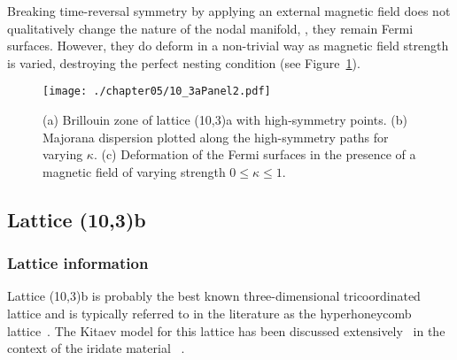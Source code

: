 Breaking time-reversal symmetry by applying an external magnetic field does not qualitatively change the nature of the nodal manifold, \ie, they remain Fermi surfaces.
However, they do deform in a non-trivial way as magnetic field strength is varied, destroying the perfect nesting condition (see Figure~\ref{fig:chapter05_10_3aPanel2}).
%
\begin{figure}[tb]
	\centering
	\texttt{[image: ./chapter05/10\_3aPanel2.pdf]}
	\caption{
		(a) Brillouin zone of lattice (10,3)a with high-symmetry points.
		(b) Majorana dispersion plotted along the high-symmetry paths for varying $\kappa$.
		(c) Deformation of the Fermi surfaces in the presence of a magnetic field of varying strength $0 \leq \kappa \leq 1$.
	}
	\label{fig:chapter05_10_3aPanel2}
\end{figure}
%


%
%
\subsection{Lattice (10,3)b}
\label{section:chapter05_10_3b}
%
%
\subsubsection{Lattice information}
%
%
Lattice (10,3)b is probably the best known three-dimensional tricoordinated lattice and is typically referred to in the literature as the hyperhoneycomb lattice~\cite{TakayamaPRL2015}.
The Kitaev model for this lattice has been discussed extensively~\cite{MandalPRB2009,HermannsPRB2014,LeePRB2014,KimchiPRB2014,NasuPRB2014} in the context of the iridate material \betaLithiumIridate~\cite{TakayamaPRL2015}.

